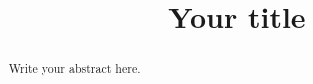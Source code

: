 \documentclass[conference]{IEEEtran}
\title{Your title}
\author{\IEEEauthorblockN{Your name}\IEEEauthorblockA{Your institution}}
\begin{document}
\maketitle
\begin{abstract}
Write your abstract here.
\end{abstract}










\end{document}
